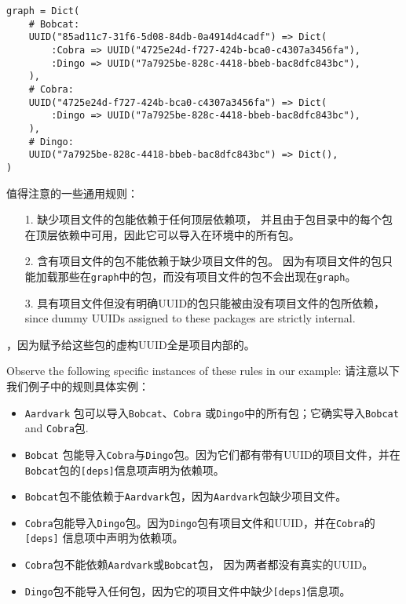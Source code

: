 \begin{verbatim}
graph = Dict(
    # Bobcat:
    UUID("85ad11c7-31f6-5d08-84db-0a4914d4cadf") => Dict(
        :Cobra => UUID("4725e24d-f727-424b-bca0-c4307a3456fa"),
        :Dingo => UUID("7a7925be-828c-4418-bbeb-bac8dfc843bc"),
    ),
    # Cobra:
    UUID("4725e24d-f727-424b-bca0-c4307a3456fa") => Dict(
        :Dingo => UUID("7a7925be-828c-4418-bbeb-bac8dfc843bc"),
    ),
    # Dingo:
    UUID("7a7925be-828c-4418-bbeb-bac8dfc843bc") => Dict(),
)
\end{verbatim}



值得注意的一些通用规则：



\begin{itemize}
\item[1. ] 缺少项目文件的包能依赖于任何顶层依赖项， 并且由于包目录中的每个包在顶层依赖中可用，因此它可以导入在环境中的所有包。


\item[2. ] 含有项目文件的包不能依赖于缺少项目文件的包。 因为有项目文件的包只能加载那些在\texttt{graph}中的包，而没有项目文件的包不会出现在\texttt{graph}。


\item[3. ] 具有项目文件但没有明确UUID的包只能被由没有项目文件的包所依赖， since dummy UUIDs assigned to these packages are strictly internal.

\end{itemize}


，因为赋予给这些包的虚构UUID全是项目内部的。



Observe the following specific instances of these rules in our example: 请注意以下我们例子中的规则具体实例：



\begin{itemize}
\item \texttt{Aardvark} 包可以导入\texttt{Bobcat}、\texttt{Cobra} 或\texttt{Dingo}中的所有包；它确实导入\texttt{Bobcat} and \texttt{Cobra}包.


\item \texttt{Bobcat} 包能导入\texttt{Cobra}与\texttt{Dingo}包。因为它们都有带有UUID的项目文件，并在\texttt{Bobcat}包的\texttt{[deps]}信息项声明为依赖项。


\item \texttt{Bobcat}包不能依赖于\texttt{Aardvark}包，因为\texttt{Aardvark}包缺少项目文件。


\item \texttt{Cobra}包能导入\texttt{Dingo}包。因为\texttt{Dingo}包有项目文件和UUID，并在\texttt{Cobra}的\texttt{[deps]} 信息项中声明为依赖项。


\item \texttt{Cobra}包不能依赖\texttt{Aardvark}或\texttt{Bobcat}包， 因为两者都没有真实的UUID。


\item \texttt{Dingo}包不能导入任何包，因为它的项目文件中缺少\texttt{[deps]}信息项。

\end{itemize}


